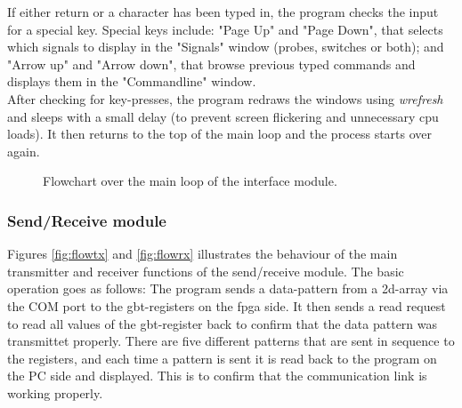 \documentclass[main.tex]{subfiles}
\begin{document}
If either return or a character has been typed in, the program checks the input for a special key. Special keys include: "Page Up" and "Page Down", that selects which signals to display in the "Signals" window (probes, switches or both); and "Arrow up" and "Arrow down", that browse previous typed commands and displays them in the "Commandline" window.\\

After checking for key-presses, the program redraws the windows using \textit{wrefresh} and sleeps with a small delay (to prevent screen flickering and unnecessary cpu loads). It then returns to the top of the main loop and the process starts over again. 

\begin{figure}[!t] %
\begin{center}
\resizebox{1\linewidth}{!}{}
\caption{Flowchart over the main loop of the interface module.}
\label{fig:flowgui}
\end{center}
\end{figure}

\subsubsection{Send/Receive module} \label{sec:sndrec}

Figures \ref{fig:flowtx} and \ref{fig:flowrx} illustrates the behaviour of the main transmitter and receiver functions of the send/receive module. The basic operation goes as follows: The program sends a data-pattern from a 2d-array via the COM port to the \gls{gbt}-registers on the \gls{fpga} side. It then sends a read request to read all values of the \gls{gbt}-register back to confirm that the data pattern was transmittet properly. There are five different patterns that are sent in sequence to the registers, and each time a pattern is sent it is read back to the program on the PC side and displayed. This is to confirm that the communication link is working properly. \\
\end{document}
